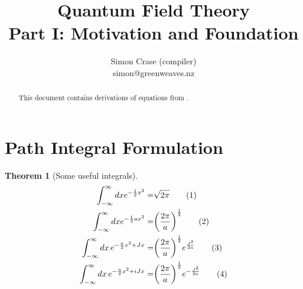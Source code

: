 \documentclass[]{article}
\title{Quantum Field Theory\\
Part I: Motivation and Foundation}
\author{Simon Crase (compiler)\\simon@greenweaves.nz}
\newcommand\numberthis{\addtocounter{equation}{1}\tag{\theequation}}
\newtheorem{thm}{Theorem}
\begin{document}
\maketitle

\begin{abstract}

This document contains derivations of equations from \cite[Part I: Motivation and Foundation]{zee2010quantum}.

\end{abstract}

\tableofcontents


\section{Path Integral Formulation}

\begin{thm}[Some useful integrals]
	\begin{align*}
		\int_{-\infty}^{\infty} dx e^{-\frac{1}{2}x^2} =& \sqrt{2\pi} \numberthis \label{eq:integral:gaussian0}\\
		\int_{-\infty}^{\infty} dx e^{-\frac{1}{2}ax^2} =& \bigg(\frac{2\pi}{a}\bigg)^\frac{1}{2} \numberthis \label{eq:integral:gaussian}\\
		\int_{-\infty}^{\infty} dx\,e^{-\frac{a}{2} x^2+Jx}=&\bigg(\frac{2\pi}{a}\bigg)^\frac{1}{2}e^\frac{J^2}{2a} \numberthis \label{eq:integral:gaussian1}\\
		\int_{-\infty}^{\infty} dx\,e^{-\frac{a}{2} x^2+iJx}=&\bigg(\frac{2\pi}{a}\bigg)^\frac{1}{2}e^{-\frac{J^2}{2a}} \numberthis \label{eq:integral:gaussian2}
	\end{align*}
\end{thm}
\end{document}
